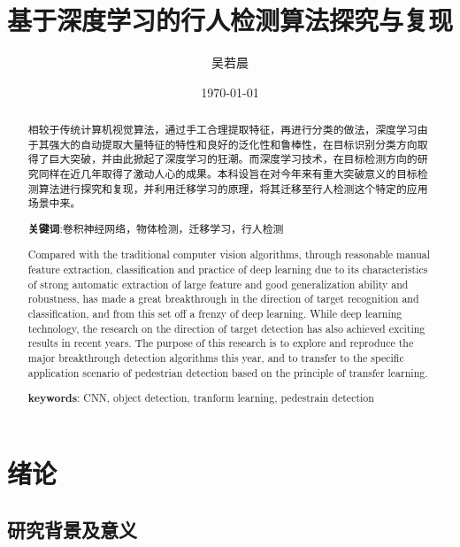 \documentclass[12pt,a4paper,titlepage]{article}
\title{基于深度学习的行人检测算法探究与复现}
\author{吴若晨}
\date{\today}
\begin{document}
\maketitle

\renewcommand{\abstractname}{\zihao{3} 摘要}
\begin{abstract}
相较于传统计算机视觉算法，通过手工合理提取特征，再进行分类的做法，深度学习由于其强大的自动提取大量特征的特性和良好的泛化性和鲁棒性，在目标识别分类方向取得了巨大突破，并由此掀起了深度学习的狂潮。而深度学习技术，在目标检测方向的研究同样在近几年取得了激动人心的成果。本科设旨在对今年来有重大突破意义的目标检测算法进行探究和复现，并利用迁移学习的原理，将其迁移至行人检测这个特定的应用场景中来。
\begin{center}
{\textbf{关键词}:卷积神经网络，物体检测，迁移学习，行人检测}
\end{center}
\end{abstract}

\renewcommand{\abstractname}{\zihao{3} Abstract}
\begin{abstract}
Compared with the traditional computer vision algorithms, through reasonable manual feature extraction, classification and practice of deep learning due to its characteristics of strong automatic extraction of large feature and good generalization ability and robustness, has made a great breakthrough in the direction of target recognition and classification, and from this set off a frenzy of deep learning. While deep learning technology, the research on the direction of target detection has also achieved exciting results in recent years. The purpose of this research is to explore and reproduce the major breakthrough detection algorithms this year, and to transfer to the specific application scenario of pedestrian detection based on the principle of transfer learning.
\begin{center}
{\textbf{keywords}: CNN, object detection, tranform learning, pedestrain detection}
\end{center}
\end{abstract}

\renewcommand{\contentsname}{目录}
\tableofcontents
\newpage

\section{绪论}
\subsection{研究背景及意义}
\end{document}
